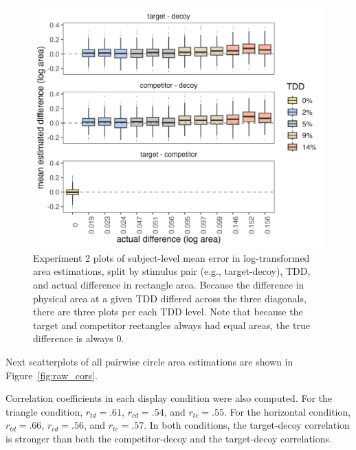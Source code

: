 \begin{figure}
   \centering
   \includegraphics[width=\textwidth]{figures/circleAreaPhase_boxplot_meanlogdiffs_no_outliers.jpeg}
   \caption{Experiment 2 plots of subject-level mean error in log-transformed area estimations, split by stimulus pair (e.g., target-decoy), TDD, and actual difference in rectangle area. Because the difference in physical area at a given TDD differed across the three diagonals, there are three plots per each TDD level. Note that because the target and competitor rectangles always had equal areas, the true difference is always 0.}
   \label{fig:circle_boxplots}
\end{figure}

Next scatterplots of all pairwise circle area estimations are shown in Figure~\ref{fig:raw_cors}. 

Correlation coefficients in each display condition were also computed. For the triangle condition, $r_{td}=.61$, $r_{cd}=.54$, and $r_{tc}=.55$. For the horizontal condition, $r_{td}=.66$, $r_{cd}=.56$, and $r_{tc}=.57$. In both conditions, the target-decoy correlation is stronger than both the competitor-decoy and the target-decoy correlations. 

